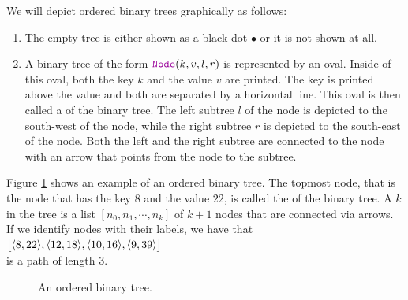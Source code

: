 \noindent
We will depict ordered binary trees graphically as follows:
\begin{enumerate}
\item The empty tree  is either shown as a black dot $\bullet$ or it is not shown at all.
\item A binary tree of the form $\mytt{Node}(k,v,l,r)$ is represented by an oval.  Inside of this
      oval, both the key $k$ and the value $v$ are printed.  The key is printed above the value and
      both are separated by a horizontal line.  This oval is then called a
        of the binary tree. 
      The left subtree $l$ of the node is depicted to the south-west of the node,
      while the right subtree $r$ is depicted to the south-east of the node.  Both the left
      and the right subtree are connected to the node with an arrow that points from the node to the
      subtree.
\end{enumerate}
Figure \ref{fig:graph1} shows an example of an ordered binary tree.  The topmost node, that is the
node that has the key $8$ and the value $22$, is called the   of the binary tree.
A  $k$ in the tree is a list $[n_0,n_1, \cdots, n_k]$ of
$k+1$ nodes that are connected via arrows.  If we identify nodes with their labels, we have that
\\[0.2cm]
\hspace*{1.3cm} $\bigl[ \pair(8,22), \pair(12,18), \pair(10,16), \pair(9,39) \bigr]$ \\[0.2cm]
is a path of length 3.


\begin{figure}[!ht]
  \centering
  \caption{An ordered binary tree.}
  \label{fig:graph1}
\end{figure}


